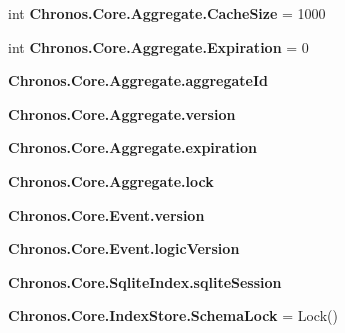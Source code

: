 \begin{DoxyCompactItemize}
\item 
int {\bfseries Chronos.\+Core.\+Aggregate.\+Cache\+Size} = 1000\hypertarget{group__Chronos_ga344506c5b5a2fcbd6a0499999a21959a}{}\label{group__Chronos_ga344506c5b5a2fcbd6a0499999a21959a}

\item 
int {\bfseries Chronos.\+Core.\+Aggregate.\+Expiration} = 0\hypertarget{group__Chronos_ga0f5078bf576052c268439c93b51a889f}{}\label{group__Chronos_ga0f5078bf576052c268439c93b51a889f}

\item 
{\bfseries Chronos.\+Core.\+Aggregate.\+aggregate\+Id}\hypertarget{group__Chronos_ga6c8a09a2cba1cb7f1720465e222a902a}{}\label{group__Chronos_ga6c8a09a2cba1cb7f1720465e222a902a}

\item 
{\bfseries Chronos.\+Core.\+Aggregate.\+version}\hypertarget{group__Chronos_ga601b79fd2c9061c05e217025b976d628}{}\label{group__Chronos_ga601b79fd2c9061c05e217025b976d628}

\item 
{\bfseries Chronos.\+Core.\+Aggregate.\+expiration}\hypertarget{group__Chronos_ga1803e018eb693b61414083ef154b5270}{}\label{group__Chronos_ga1803e018eb693b61414083ef154b5270}

\item 
{\bfseries Chronos.\+Core.\+Aggregate.\+lock}\hypertarget{group__Chronos_gaabe041e91ea7d8af2b0a02062f5a7370}{}\label{group__Chronos_gaabe041e91ea7d8af2b0a02062f5a7370}

\item 
{\bfseries Chronos.\+Core.\+Event.\+version}\hypertarget{group__Chronos_ga7346dbdeab3417b839838c77c5c9f154}{}\label{group__Chronos_ga7346dbdeab3417b839838c77c5c9f154}

\item 
{\bfseries Chronos.\+Core.\+Event.\+logic\+Version}\hypertarget{group__Chronos_ga5e5dbec6563cdda169fdc578f1eaa434}{}\label{group__Chronos_ga5e5dbec6563cdda169fdc578f1eaa434}

\item 
{\bfseries Chronos.\+Core.\+Sqlite\+Index.\+sqlite\+Session}\hypertarget{group__Chronos_ga201f90627a2d2a03be835c01b15ff52d}{}\label{group__Chronos_ga201f90627a2d2a03be835c01b15ff52d}

\item 
{\bfseries Chronos.\+Core.\+Index\+Store.\+Schema\+Lock} = Lock()\hypertarget{group__Chronos_ga5bbc7c7e4f5743348102221d3b01188e}{}\label{group__Chronos_ga5bbc7c7e4f5743348102221d3b01188e}


\end{DoxyCompactItemize}
